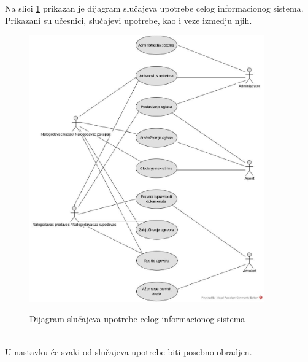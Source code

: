 \documentclass{article}
\begin{document}
Na slici \ref{fig:dijagramSlucajevaUpotrebeCelogIS} prikazan je dijagram slu\v{c}ajeva upotrebe celog informacionog sistema. Prikazani su u\v{c}esnici, slu\v{c}ajevi upotrebe, kao i veze izme{dj}u njih.\\
\begin{figure}[h]
		\centering
		\includegraphics[width=0.9\textwidth,height=0.74\textheight]{Pictures/DijagramSlucajevaUpotrebeCelogInformacionogSistema}\\
		\caption{Dijagram slu\v{c}ajeva upotrebe celog informacionog sistema}
		\label{fig:dijagramSlucajevaUpotrebeCelogIS}
	\end{figure}\\
U nastavku \'{c}e svaki od slu\v{c}ajeva upotrebe biti posebno obra{dj}en.

\newpage
\end{document}
